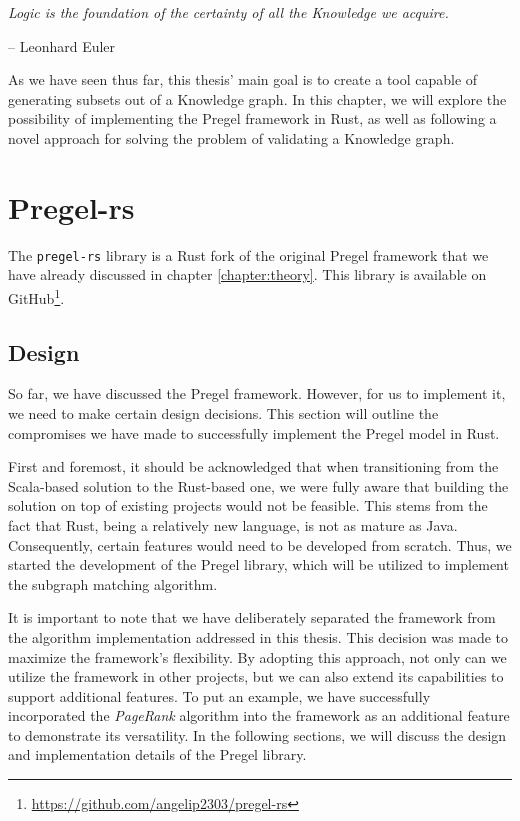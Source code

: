 \epigraph{\textit{Logic is the foundation of the certainty of all the Knowledge we acquire.}}{-- \textup{Leonhard Euler}}

As we have seen thus far, this thesis' main goal is to create a tool capable of generating subsets out of a Knowledge graph. In this chapter, we will explore the possibility of implementing the Pregel framework in Rust, as well as following a novel approach for solving the problem of validating a Knowledge graph.

\section{Pregel-rs}

The \texttt{pregel-rs} library is a Rust fork of the original Pregel framework that we have already discussed in chapter \ref{chapter:theory}. This library is available on GitHub\footnote{\url{https://github.com/angelip2303/pregel-rs}}.

\subsection{Design}

So far, we have discussed the Pregel framework. However, for us to implement it, we need to make certain design decisions. This section will outline the compromises we have made to successfully implement the Pregel model in Rust.

First and foremost, it should be acknowledged that when transitioning from the Scala-based solution to the Rust-based one, we were fully aware that building the solution on top of existing projects would not be feasible. This stems from the fact that Rust, being a relatively new language, is not as mature as Java. Consequently, certain features would need to be developed from scratch. Thus, we started the development of the Pregel library, which will be utilized to implement the subgraph matching algorithm.

It is important to note that we have deliberately separated the framework from the algorithm implementation addressed in this thesis. This decision was made to maximize the framework's flexibility. By adopting this approach, not only can we utilize the framework in other projects, but we can also extend its capabilities to support additional features. To put an example, we have successfully incorporated the \textit{PageRank} algorithm into the framework as an additional feature to demonstrate its versatility. In the following sections, we will discuss the design and implementation details of the Pregel library.

